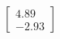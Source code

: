 \documentclass[preview]{standalone}
\begin{document}
\begin{align*}
\begin{bmatrix} 4.89 \\ -2.93 \end{bmatrix}
\end{align*}
\end{document}
